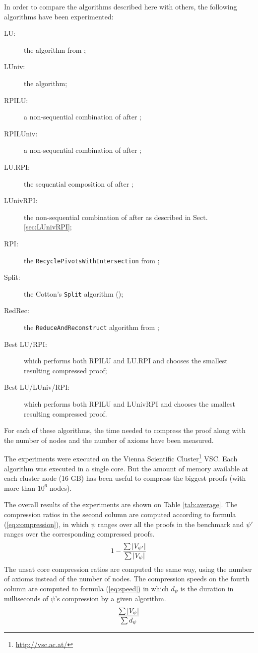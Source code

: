 \documentclass{llncs}
\begin{document}
In order to compare the algorithms described here with others, the following algorithms have been experimented:
\begin{description}
  \item[LU:] the {\LowerUnits} algorithm from \cite{LURPI};
  \item[LUniv:] the {\LowerUnivalents} algorithm;
  \item[RPILU:] a non-sequential combination of {\RPI} after {\LowerUnits};
  \item[RPILUniv:] a non-sequential combination of {\RPI} after {\LowerUnivalents};
  \item[LU.RPI:] the sequential composition of {\LowerUnits} after {\RPI};
  \item[LUnivRPI:] the non-sequential combination of {\LowerUnivalents} after {\RPI} as described in Sect. \ref{sec:LUnivRPI};
  \item[RPI:] the \texttt{RecyclePivotsWithIntersection} from \cite{LURPI};
  \item[Split:] the Cotton's \texttt{Split} algorithm (\cite{CottonSplit}); 
  \item[RedRec:] the \texttt{ReduceAndReconstruct} algorithm from \cite{RedRec};
  \item[Best LU/RPI:] which performs both RPILU and LU.RPI and chooses the smallest resulting compressed proof;
  \item[Best LU/LUniv/RPI:] which performs both RPILU and LUnivRPI and chooses the smallest resulting
    compressed proof.
\end{description}

For each of these algorithms, the time needed to compress the proof along with the number of nodes
and the number of axioms have been measured. 

The experiments were executed on the Vienna Scientific Cluster\footnote{\url{http://vsc.ac.at/}}
VSC. Each algorithm was executed in a single core. But the amount of memory available
at each cluster node (16 GB) has been useful to compress the biggest proofs (with more than $10^6$
nodes).


The overall results of the experiments are shown on Table \ref{tab:average}. The compression
ratios in the second column are computed according to formula (\ref{eq:compression}), in which $\psi$ ranges
over all the proofs in the benchmark and $\psi'$ ranges over the corresponding compressed proofs.
\begin{equation} \label{eq:compression}
  1 - \frac{ \sum {|V_{\psi'}|} }{ \sum {|V_{\psi}|} }
\end{equation}
The unsat core compression ratios are computed the same way, using the number of axioms instead of
the number of nodes. The compression speeds on the fourth column
are computed to formula (\ref{eq:speed}) in which $d_{\psi}$ is the duration in milliseconds of
$\psi$'s compression by a given algorithm.
\begin{equation} \label{eq:speed}
  \frac{ \sum {|V_{\psi}|} }{ \sum {d_{\psi}} }
\end{equation}
\end{document}
